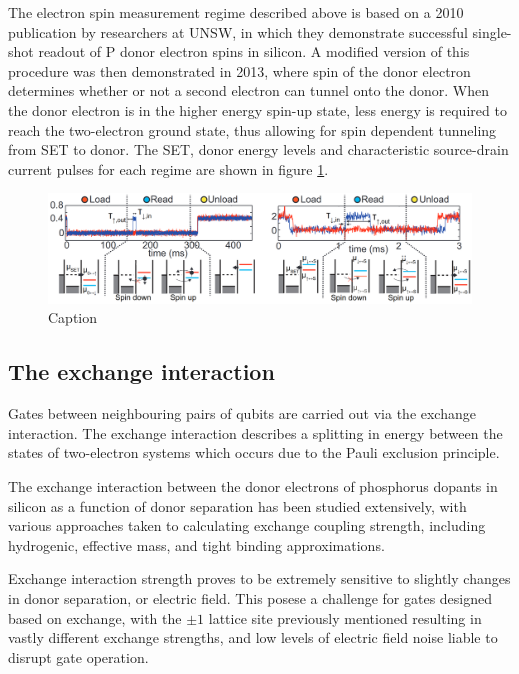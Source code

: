 \documentclass[../Thesis.tex]{subfiles}
\begin{document}
The electron spin measurement regime described above is based on a 2010 publication by researchers at UNSW, in which they demonstrate successful single-shot readout of P donor electron spins in silicon\cite{morello_single-shot_2010}. A modified version of this procedure was then demonstrated in 2013\cite{pla_high-fidelity_2013}, where spin of the donor electron determines whether or not a second electron can tunnel onto the donor. When the donor electron is in the higher energy spin-up state, less energy is required to reach the two-electron ground state, thus allowing for spin dependent tunneling from SET to donor. The SET, donor energy levels and characteristic source-drain current pulses for each regime are shown in figure \ref{fig:readout}. 
\begin{figure}
    \centering
    \includegraphics[width=16cm]{graphics/Introduction/readout_AB.PNG}
    \caption{Caption}
    \label{fig:readout}
\end{figure}

\subsection{The exchange interaction}
Gates between neighbouring pairs of qubits are carried out via the exchange interaction. The exchange interaction describes a splitting in energy between the states of two-electron systems which occurs due to the Pauli exclusion principle\cite{kittel_introduction_2005}.

The exchange interaction between the donor electrons of phosphorus dopants in silicon as a function of donor separation has been studied extensively, with various approaches taken to calculating exchange coupling strength, including hydrogenic\cite{fang_effects_2002},
effective mass\cite{koiller_exchange_2001,wellard_voltage_2004}, and 
tight binding \cite{wang_highly_2016} approximations.
 
Exchange interaction strength proves to be extremely sensitive to slightly changes in donor separation, or electric field. This posese a challenge for gates designed based on exchange, with the $\pm 1$ lattice site previously mentioned resulting in vastly different exchange strengths, and low levels of electric field noise liable to disrupt gate operation.
 
\end{document}
